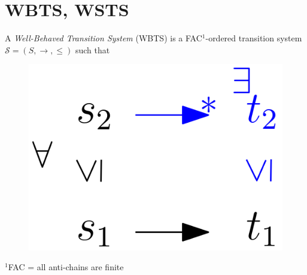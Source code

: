 \documentclass{beamer}
\begin{document}
	\section{WBTS, WSTS}
  \begin{frame}{}
  
  \begin{definition}
A {\em Well-Behaved Transition System} (WBTS) 
is a FAC$^1$-ordered transition system $\mathscr{S}=(S, \rightarrow, \leq)$ such that   
\end{definition}


   \begin{center}
 	\begin{figure}
\includegraphics[width=.25\textwidth]{WSTS_def}
	\end{figure}
\end{center}  

\phantom{line}

{\small $^1${FAC = all anti-chains are finite}}

    \end{frame}
\end{document}
